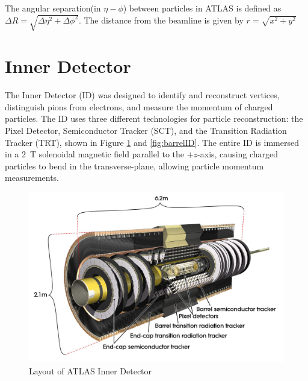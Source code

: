 The angular separation(in $\eta-\phi$) between particles in ATLAS is defined as $\Delta R = \sqrt{\Delta \eta^{2}+\Delta \phi^{2}}$. The distance from the beamline is given by $r=\sqrt{x^{2}+y^{2}}$
 
\section{Inner Detector}
The Inner Detector (ID) was designed to identify and reconstruct vertices, distinguish pions from electrons, and measure the momentum of charged particles. The ID uses three different technologies for particle reconstruction: the Pixel Detector, Semiconductor Tracker (SCT), and the Transition Radiation Tracker (TRT), shown in Figure \ref{fig:ID} and \ref{fig:barrelID}. The entire ID is immersed in a 2~T solenoidal magnetic field parallel to the $+z$-axis, causing charged particles to bend in the transverse-plane, allowing particle momentum measurements. 

\begin{figure}[h!]
  \centering
  \includegraphics[width=\hsize]{figures/Detector/tracker_layout.jpg}
  \caption{Layout of ATLAS Inner Detector} 
  \label{fig:ID}
\end{figure}
\FloatBarrier


